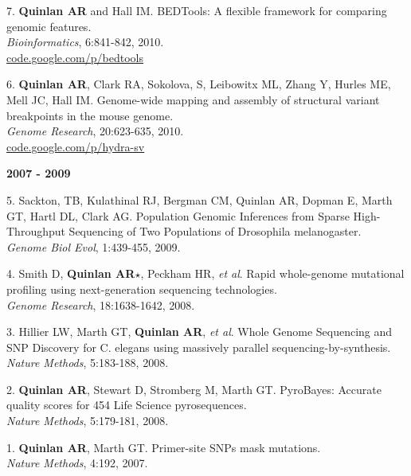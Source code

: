 \documentclass[margin,line]{cv}
\begin{document}
\begin{resume}
\begin{list}{*}{}
    \item[7.] \textbf{Quinlan AR} and Hall IM.
    BEDTools: A flexible framework for comparing genomic features.\\
    \textit{Bioinformatics}, 6:841-842, 2010.\\
    \url{code.google.com/p/bedtools}

    \item[6.] \textbf{Quinlan AR}, Clark RA, Sokolova, S, Leibowitx ML, Zhang Y, Hurles ME, Mell JC, Hall IM.
    Genome-wide mapping and assembly of structural variant breakpoints in the mouse genome.\\
    \textit{Genome Research}, 20:623-635, 2010.\\
    \url{code.google.com/p/hydra-sv}

    \end{list}


    \textbf{2007 - 2009} \\
    \begin{list}{*}{}

    \item[5.] Sackton, TB, Kulathinal RJ, Bergman CM, Quinlan AR, Dopman E, Marth GT, Hartl DL, Clark AG.
    Population Genomic Inferences from Sparse High-Throughput Sequencing of Two Populations of Drosophila melanogaster.\\
    \textit{Genome Biol Evol}, 1:439-455, 2009.

    \item[4.] Smith D, \textbf{Quinlan AR}$\star$, Peckham HR, \textit{et al}.
    Rapid whole-genome mutational profiling using next-generation sequencing technologies.\\
    \textit{Genome Research}, 18:1638-1642, 2008.

    \item[3.] Hillier LW, Marth GT, \textbf{Quinlan AR}, \textit{et al}.
    Whole Genome Sequencing and SNP Discovery for C. elegans using massively parallel sequencing-by-synthesis.\\
    \textit{Nature Methods}, 5:183-188, 2008.

    \item[2.] \textbf{Quinlan AR}, Stewart D, Stromberg M, Marth GT.
    PyroBayes: Accurate quality scores for 454 Life Science pyrosequences.\\
    \textit{Nature Methods}, 5:179-181, 2008.

    \item[1.] \textbf{Quinlan AR}, Marth GT.
    Primer-site SNPs mask mutations.\\
    \textit{Nature Methods}, 4:192, 2007.


\end{list}
\end{resume}
\end{document}
